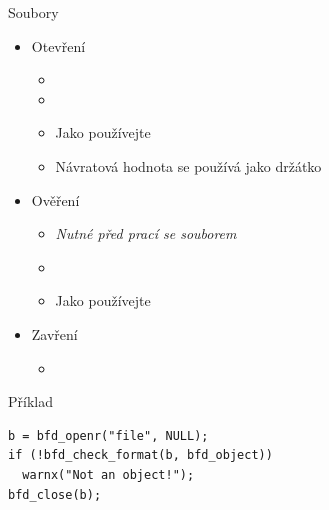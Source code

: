 \begin{frame}[fragile]{Soubory}

  \begin{itemize}
    \item Otevření
    \begin{itemize}
      \item {}
      \item {}
      \item Jako  používejte 
      \item Návratová hodnota se používá jako držátko
    \end{itemize}

    \pause

    \item Ověření
    \begin{itemize}
      \item \emph{Nutné před prací se souborem}
      \item {}
      \item Jako  používejte 
    \end{itemize}

    \pause

    \item Zavření
    \begin{itemize}
      \item {}
    \end{itemize}
  \end{itemize}

  \pause

  \begin{block}{Příklad}
  \begin{lstlisting}[aboveskip=2pt,belowskip=2pt]
b = bfd_openr("file", NULL);
if (!bfd_check_format(b, bfd_object))
  warnx("Not an object!");
bfd_close(b);
  \end{lstlisting}
  \end{block}

\end{frame}

